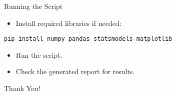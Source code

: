 \documentclass[aspectratio=169]{beamer}
\begin{document}
\begin{frame}{Running the Script}
  \begin{itemize}
    \item Install required libraries if needed:
  \end{itemize}
  \vspace{0.5cm} %
  \begin{verbatim}
pip install numpy pandas statsmodels matplotlib
  \end{verbatim}
  \vspace{0.5cm} %
  \begin{itemize}
    \item Run the script.
    \item Check the generated report for results.
  \end{itemize}
\end{frame}

\begin{frame}
  \centering
  \Huge Thank You!
  \vspace{1cm}
\end{frame}
\end{document}

